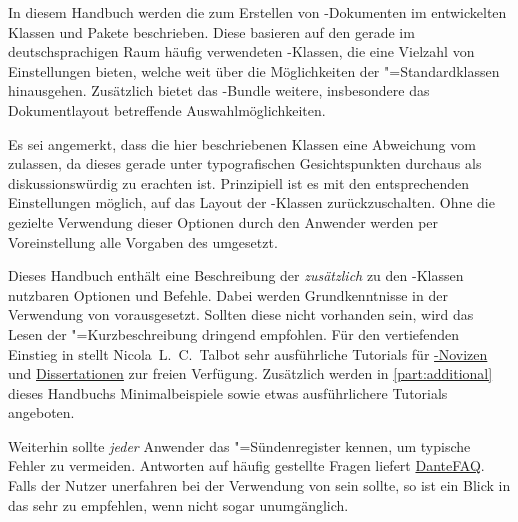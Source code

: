 \addchap[tocentry={}]{\prefacename}

In diesem Handbuch werden die zum Erstellen von -Dokumenten 
im \href{https://tu-dresden.de/cd}{\TUDCD} entwickelten Klassen und Pakete 
beschrieben. Diese basieren auf den gerade im deutschsprachigen Raum häufig 
verwendeten \KOMAScript-Klassen, die eine Vielzahl von Einstellungen bieten, 
welche weit über die Möglichkeiten der "=Standardklassen 
hinausgehen. Zusätzlich bietet das \TUDScript-Bundle weitere, insbesondere das 
Dokumentlayout betreffende Auswahlmöglichkeiten.

Es sei angemerkt, dass die hier beschriebenen Klassen eine Abweichung vom 
\TUDCD zulassen, da dieses gerade unter typografischen Gesichtspunkten 
durchaus als diskussionswürdig zu erachten ist. Prinzipiell ist es mit den 
entsprechenden Einstellungen möglich, auf das Layout der \KOMAScript-Klassen 
zurückzuschalten. Ohne die gezielte Verwendung dieser Optionen durch den 
Anwender werden per Voreinstellung alle Vorgaben des \CDs umgesetzt.

Dieses Handbuch enthält eine Beschreibung der \emph{zusätzlich} zu den 
\KOMAScript-Klassen nutzbaren Optionen und Befehle. Dabei werden 
Grundkenntnisse in der Verwendung von  vorausgesetzt. Sollten 
diese nicht vorhanden sein, wird das Lesen der 
"=Kurzbeschreibung
\href{http://mirrors.ctan.org/info/lshort/german/l2kurz.pdf}{}
dringend empfohlen. Für den vertiefenden Einstieg in  stellt 
Nicola~L.~C.~Talbot sehr ausführliche Tutorials für 
\href{http://www.dickimaw-books.com/latex/novices/}{-Novizen} 
und \href{http://www.dickimaw-books.com/latex/thesis/}{Dissertationen} zur 
freien Verfügung. Zusätzlich werden in \autoref{part:additional} dieses 
Handbuchs Minimalbeispiele sowie etwas ausführlichere Tutorials angeboten.

Weiterhin sollte \emph{jeder} Anwender das "=Sündenregister 
\href{http://mirrors.ctan.org/info/l2tabu/german/l2tabu.pdf}{}
kennen, um typische Fehler zu vermeiden. Antworten auf häufig gestellte Fragen 
liefert \href{http://projekte.dante.de/DanteFAQ/WebHome}{DanteFAQ}. Falls der 
Nutzer unerfahren bei der Verwendung von \KOMAScript sein sollte, so ist ein 
Blick in das  sehr zu empfehlen, wenn nicht 
sogar unumgänglich.

